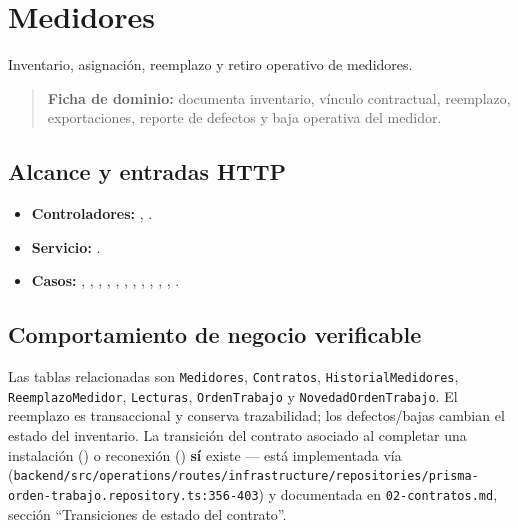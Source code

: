 \section{Medidores}


Inventario, asignación, reemplazo y retiro operativo de medidores.


\begin{quote}
\textbf{Ficha de dominio:} documenta inventario, vínculo contractual, reemplazo, exportaciones, reporte de defectos y baja operativa del medidor.
\end{quote}


\subsection{Alcance y entradas HTTP}


\begin{itemize}
\item \textbf{Controladores:} \texttt{}, \texttt{}.
\item \textbf{Servicio:} \texttt{}.
\item \textbf{Casos:} \texttt{}, \texttt{}, \texttt{}, \texttt{}, \texttt{}, \texttt{}, \texttt{}, \texttt{}, \texttt{}, \texttt{}, \texttt{}, \texttt{}.
\end{itemize}

\subsection{Comportamiento de negocio verificable}
Las tablas relacionadas son \texttt{Medidores}, \texttt{Contratos}, \texttt{HistorialMedidores}, \texttt{ReemplazoMedidor}, \texttt{Lecturas}, \texttt{OrdenTrabajo} y \texttt{NovedadOrdenTrabajo}. El reemplazo es transaccional y conserva trazabilidad; los defectos/bajas cambian el estado del inventario. La transici\'on del contrato asociado al completar una instalaci\'on (\texttt{}) o reconexi\'on (\texttt{}) \textbf{s\'i} existe --- est\'a implementada v\'ia \texttt{} (\texttt{backend/src/operations/routes/infrastructure/repositories/prisma-orden-trabajo.repository.ts:356-403}) y documentada en \texttt{02-contratos.md}, secci\'on ``Transiciones de estado del contrato''.


